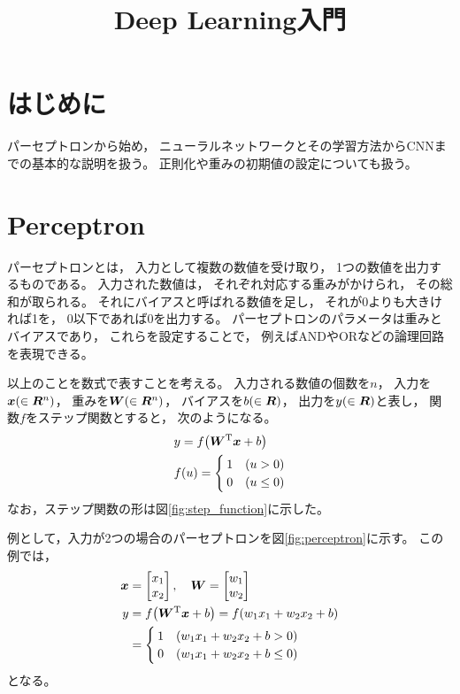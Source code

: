 \documentclass[class=jsarticle, crop=false, dvipdfmx, fleqn]{standalone}
\title{Deep Learning入門}
\begin{document}
\maketitle
\tableofcontents


\section{はじめに}

パーセプトロンから始め，
ニューラルネットワークとその学習方法からCNNまでの基本的な説明を扱う。
正則化や重みの初期値の設定についても扱う。



\section{Perceptron}
\label{sec:perceptron}

パーセプトロンとは，
入力として複数の数値を受け取り，
1つの数値を出力するものである。
入力された数値は，
それぞれ対応する重みがかけられ，
その総和が取られる。
それにバイアスと呼ばれる数値を足し，
それが0よりも大きければ1を，
0以下であれば0を出力する。
パーセプトロンのパラメータは重みとバイアスであり，
これらを設定することで，
例えばANDやORなどの論理回路を表現できる。

以上のことを数式で表すことを考える。
入力される数値の個数を$n$，
入力を$\bm{x} \qty(\in \bm{R}^n)$，
重みを$\bm{W} \qty(\in \bm{R}^n)$，
バイアスを$b\qty(\in \bm{R})$，
出力を$y\qty(\in \bm{R})$と表し，
関数$f$をステップ関数とすると，
次のようになる。
\begin{align}
& y = f \qty(\bm{W}^\mathrm{T} \bm{x} + b) \\
& f(u) =
	\begin{cases}
		1 & (u > 0) \\
		0 & (u \leq 0)
	\end{cases}
\end{align}
なお，ステップ関数の形は図\ref{fig:step_function}に示した。

例として，入力が2つの場合のパーセプトロンを図\ref{fig:perceptron}に示す。
この例では，
\begin{align}
\bm{x} & = \begin{bmatrix} x_1 \\ x_2 \end{bmatrix}, \quad
\bm{W} = \begin{bmatrix} w_1 \\ w_2 \end{bmatrix} \\
y & = f\qty(\bm{W}^\mathrm{T} \bm{x} + b) = f\qty(w_1 x_1 + w_2 x_2 + b) \\
	 & =
	 	\begin{cases}
			1 & \qty(w_1 x_1 + w_2 x_2 + b > 0) \\
			0 & \qty(w_1 x_1 + w_2 x_2 + b \leq 0) 
		\end{cases}
\end{align}
となる。
\end{document}
